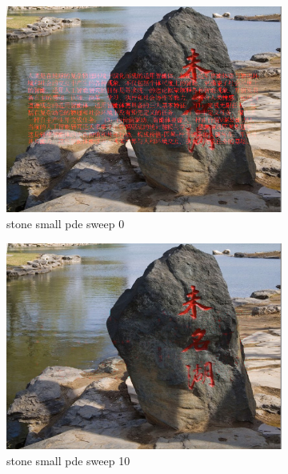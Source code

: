 \documentclass[11pt]{article}
\begin{document}
\begin{figure}[ht!]
    \centering
    \hfill%
    \begin{subfigure}[]{0.333\linewidth}
        \centering
        \includegraphics[width=\linewidth]{fig/restoration/stone_small/pde_0.jpg}
        \caption{stone small pde sweep 0}
    \end{subfigure}%
    \hfill%
    \begin{subfigure}[]{0.333\linewidth}
        \centering
        \includegraphics[width=\linewidth]{fig/restoration/stone_small/pde_10.jpg}
        \caption{stone small pde sweep 10}
    \end{subfigure}%
    \hfill%
    \begin{subfigure}[]{0.333\linewidth}

\end{subfigure}
\end{figure}
\end{document}

